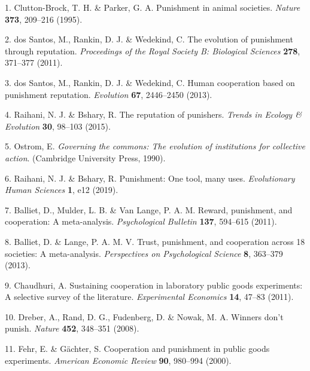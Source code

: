 \documentclass[
  english,
  man, donotrepeattitle,floatsintext]{apa6}
\newenvironment{cslreferences}%
  {}%
  {\par}
\begin{document}
\hypertarget{refs}{}
\begin{cslreferences}
\leavevmode\hypertarget{ref-CluttonBrock1995}{}%
1. Clutton-Brock, T. H. \& Parker, G. A. Punishment in animal societies. \emph{Nature} \textbf{373}, 209--216 (1995).

\leavevmode\hypertarget{ref-DosSantos2011}{}%
2. dos Santos, M., Rankin, D. J. \& Wedekind, C. The evolution of punishment through reputation. \emph{Proceedings of the Royal Society B: Biological Sciences} \textbf{278}, 371--377 (2011).

\leavevmode\hypertarget{ref-DosSantos2013}{}%
3. dos Santos, M., Rankin, D. J. \& Wedekind, C. Human cooperation based on punishment reputation. \emph{Evolution} \textbf{67}, 2446--2450 (2013).

\leavevmode\hypertarget{ref-Raihani2015}{}%
4. Raihani, N. J. \& Bshary, R. The reputation of punishers. \emph{Trends in Ecology \& Evolution} \textbf{30}, 98--103 (2015).

\leavevmode\hypertarget{ref-Ostrom1990}{}%
5. Ostrom, E. \emph{Governing the commons: The evolution of institutions for collective action}. (Cambridge University Press, 1990).

\leavevmode\hypertarget{ref-Raihani2019}{}%
6. Raihani, N. J. \& Bshary, R. Punishment: One tool, many uses. \emph{Evolutionary Human Sciences} \textbf{1}, e12 (2019).

\leavevmode\hypertarget{ref-Balliet2011}{}%
7. Balliet, D., Mulder, L. B. \& Van Lange, P. A. M. Reward, punishment, and cooperation: A meta-analysis. \emph{Psychological Bulletin} \textbf{137}, 594--615 (2011).

\leavevmode\hypertarget{ref-Balliet2013}{}%
8. Balliet, D. \& Lange, P. A. M. V. Trust, punishment, and cooperation across 18 societies: A meta-analysis. \emph{Perspectives on Psychological Science} \textbf{8}, 363--379 (2013).

\leavevmode\hypertarget{ref-Chaudhuri2011}{}%
9. Chaudhuri, A. Sustaining cooperation in laboratory public goods experiments: A selective survey of the literature. \emph{Experimental Economics} \textbf{14}, 47--83 (2011).

\leavevmode\hypertarget{ref-Dreber2008}{}%
10. Dreber, A., Rand, D. G., Fudenberg, D. \& Nowak, M. A. Winners don't punish. \emph{Nature} \textbf{452}, 348--351 (2008).

\leavevmode\hypertarget{ref-Fehr2000}{}%
11. Fehr, E. \& Gächter, S. Cooperation and punishment in public goods experiments. \emph{American Economic Review} \textbf{90}, 980--994 (2000).


\end{cslreferences}
\end{document}
